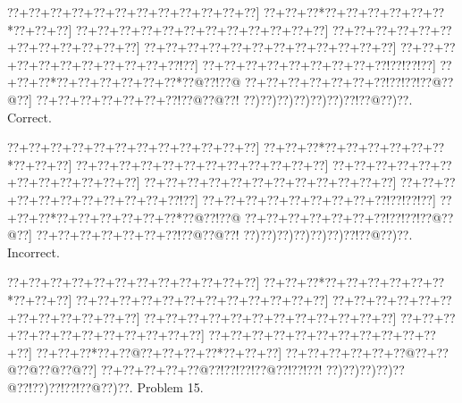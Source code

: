\documentclass[a5paper]{article}
\begin{document}
\begin{center}
{\goo
\0??+\0??+\0??+\0??+\0??+\0??+\0??+\0??+\0??+\0??+\0??+\0??]
\0??+\0??+\0??*\0??+\0??+\0??+\0??+\0??+\0??*\0??+\0??+\0??]
\0??+\0??+\0??+\0??+\0??+\0??+\0??+\0??+\0??+\0??+\0??+\0??]
\0??+\0??+\0??+\0??+\0??+\0??+\0??+\0??+\0??+\0??+\0??+\0??]
\0??+\0??+\0??+\0??+\0??+\0??+\0??+\0??+\0??+\0??+\0??+\0??]
\0??+\0??+\0??+\0??+\0??+\0??+\0??+\0??+\0??+\0??+\0??!\0??]
\0??+\0??+\0??+\0??+\0??+\0??+\0??+\0??+\0??!\0??!\0??!\0??]
\0??+\0??+\0??*\0??+\0??+\0??+\0??+\0??+\0??*\0??@\0??!\0??@
\0??+\0??+\0??+\0??+\0??+\0??+\0??!\0??!\0??!\0??@\0??@\0??]
\0??+\0??+\0??+\0??+\0??+\0??+\0??!\0??@\0??@\0??!
\0??)\0??)\0??)\0??)\0??)\0??)\0??!\0??@\0??)\0??.
}
Correct. 

\end{center}
\begin{center}
{\goo
\0??+\0??+\0??+\0??+\0??+\0??+\0??+\0??+\0??+\0??+\0??+\0??]
\0??+\0??+\0??*\0??+\0??+\0??+\0??+\0??+\0??*\0??+\0??+\0??]
\0??+\0??+\0??+\0??+\0??+\0??+\0??+\0??+\0??+\0??+\0??+\0??]
\0??+\0??+\0??+\0??+\0??+\0??+\0??+\0??+\0??+\0??+\0??+\0??]
\0??+\0??+\0??+\0??+\0??+\0??+\0??+\0??+\0??+\0??+\0??+\0??]
\0??+\0??+\0??+\0??+\0??+\0??+\0??+\0??+\0??+\0??+\0??!\0??]
\0??+\0??+\0??+\0??+\0??+\0??+\0??+\0??+\0??!\0??!\0??!\0??]
\0??+\0??+\0??*\0??+\0??+\0??+\0??+\0??+\0??*\0??@\0??!\0??@
\0??+\0??+\0??+\0??+\0??+\0??+\0??!\0??!\0??!\0??@\0??@\0??]
\0??+\0??+\0??+\0??+\0??+\0??+\0??!\0??@\0??@\0??!
\0??)\0??)\0??)\0??)\0??)\0??)\0??!\0??@\0??)\0??.
}
Incorrect. 

\end{center}
\newpage
\begin{center}
{\goo
\0??+\0??+\0??+\0??+\0??+\0??+\0??+\0??+\0??+\0??+\0??+\0??]
\0??+\0??+\0??*\0??+\0??+\0??+\0??+\0??+\0??*\0??+\0??+\0??]
\0??+\0??+\0??+\0??+\0??+\0??+\0??+\0??+\0??+\0??+\0??+\0??]
\0??+\0??+\0??+\0??+\0??+\0??+\0??+\0??+\0??+\0??+\0??+\0??]
\0??+\0??+\0??+\0??+\0??+\0??+\0??+\0??+\0??+\0??+\0??+\0??]
\0??+\0??+\0??+\0??+\0??+\0??+\0??+\0??+\0??+\0??+\0??+\0??]
\0??+\0??+\0??+\0??+\0??+\0??+\0??+\0??+\0??+\0??+\0??+\0??]
\0??+\0??+\0??*\0??+\0??@\0??+\0??+\0??+\0??*\0??+\0??+\0??]
\0??+\0??+\0??+\0??+\0??+\0??@\0??+\0??@\0??@\0??@\0??@\0??]
\0??+\0??+\0??+\0??+\0??@\0??!\0??!\0??!\0??@\0??!\0??!\0??!
\0??)\0??)\0??)\0??)\0??@\0??!\0??)\0??!\0??!\0??@\0??)\0??.
}
Problem 15.

\end{center}
\end{document}
